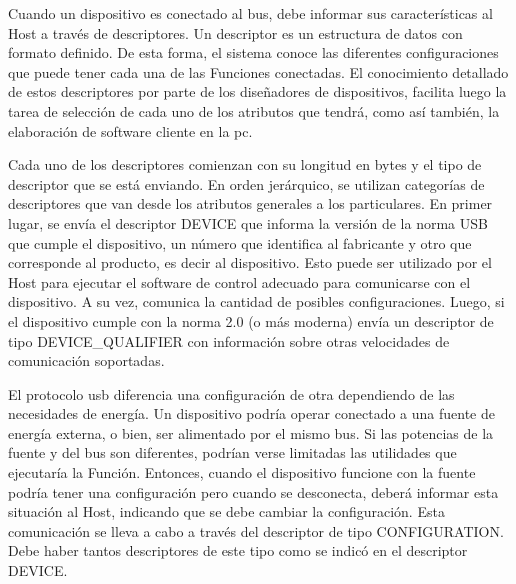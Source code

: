 %

Cuando un dispositivo es conectado al bus, debe informar sus características al Host a través de descriptores. Un descriptor es un estructura de datos con formato definido. De esta forma, el sistema conoce las diferentes configuraciones que puede tener cada una de las Funciones conectadas. El conocimiento detallado de estos descriptores por parte de los diseñadores de dispositivos, facilita luego la tarea de selección de cada uno de los atributos que tendrá, como así también, la elaboración de software cliente en la \acrshort{pc}.%

Cada uno de los descriptores comienzan con su longitud en bytes y el tipo de descriptor que se está enviando. En orden jerárquico, se utilizan categorías de descriptores que van desde los atributos generales a los particulares. En primer lugar, se envía el descriptor DEVICE que informa la versión de la norma USB que cumple el dispositivo, un número que identifica al fabricante y otro que corresponde al producto, es decir al dispositivo. Esto puede ser utilizado por el Host para ejecutar el software de control adecuado para comunicarse con el dispositivo. A su vez, comunica la cantidad de posibles configuraciones. Luego, si el dispositivo cumple con la norma 2.0 (o más moderna) envía un descriptor de tipo DEVICE\_QUALIFIER con información sobre otras velocidades de comunicación soportadas.%

El protocolo \acrshort{usb} diferencia una configuración de otra dependiendo de las necesidades de energía. Un dispositivo podría operar conectado a una fuente de energía externa, o bien, ser alimentado por el mismo bus. Si las potencias de la fuente y del bus son diferentes, podrían verse limitadas las utilidades que ejecutaría la Función. Entonces, cuando el dispositivo funcione con la fuente podría tener una configuración pero cuando se desconecta, deberá informar esta situación al Host, indicando que se debe cambiar la configuración. Esta comunicación se lleva a cabo a través del descriptor de tipo CONFIGURATION. Debe haber tantos descriptores de este tipo como se indicó en el descriptor DEVICE.%

